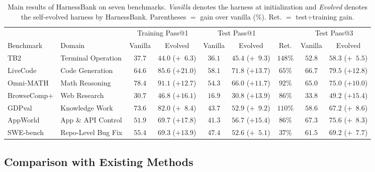 \begin{table}[t]
\centering
\footnotesize
\setlength{\tabcolsep}{3pt}
\caption{Main results of HarnessBank on seven benchmarks. \emph{Vanilla} denotes the harness at initialization and \emph{Evolved} denotes the self-evolved harness by HarnessBank. Parentheses $=$ gain over vanilla (\%). Ret. $=$
test$\div$training gain. }
\label{tab:main}
\begin{tabular}{llccccccc}
\toprule
 & & \multicolumn{2}{c}{Training Pass@1} & \multicolumn{2}{c}{Test Pass@1} & & \multicolumn{2}{c}{Test Pass@3} \\
\cmidrule(lr){3-4}\cmidrule(lr){5-6}\cmidrule(lr){8-9}
Benchmark & Domain & Vanilla & Evolved & Vanilla & Evolved & Ret. & Vanilla & Evolved \\
\midrule
TB2               & Terminal Operation  & $37.7$ & $44.0$ ($+\phantom{0}6.3$) & $36.1$ & $\mathbf{45.4}$ ($+\phantom{0}9.3$) & $148\%$ & $52.8$ & $58.3$ ($+\phantom{0}5.5$) \\
LiveCode          & Code Generation     & $64.6$ & $85.6$ ($+21.0$) & $58.1$ & $\mathbf{71.8}$ ($+13.7$) & $65\%$ & $66.7$ & $79.5$ ($+12.8$) \\
Omni-MATH         & Math Reasoning      & $78.4$ & $91.1$ ($+12.7$) & $54.3$ & $\mathbf{66.0}$ ($+11.7$) & $92\%$ & $65.0$ & $75.0$ ($+10.0$) \\
BrowseComp+       & Web Research        & $30.7$ & $46.8$ ($+16.1$) & $16.9$ & $\mathbf{30.8}$ ($+13.9$) & $86\%$ & $33.8$ & $49.2$ ($+15.4$) \\
GDPval            & Knowledge Work      & $73.6$ & $82.0$ ($+\phantom{0}8.4$) & $43.7$ & $\mathbf{52.9}$ ($+\phantom{0}9.2$) & $110\%$ & $58.6$ & $67.2$ ($+\phantom{0}8.6$) \\
AppWorld          & App \& API Control  & $51.9$ & $69.7$ ($+17.8$) & $41.3$ & $\mathbf{56.7}$ ($+15.4$) & $86\%$ & $67.3$ & $75.6$ ($+\phantom{0}8.3$) \\
SWE-bench         & Repo-Level Bug Fix  & $55.4$ & $69.3$ ($+13.9$) & $47.4$ & $\mathbf{52.6}$ ($+\phantom{0}5.1$)          & $37\%$ & $61.5$ & $69.2$ ($+\phantom{0}7.7$) \\
\bottomrule
\end{tabular}
\end{table}



\subsection{Comparison with Existing Methods}
\label{sec:baselines}


